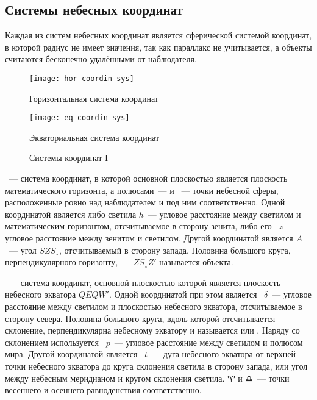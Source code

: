 \subsection{Системы небесных координат}
Каждая из систем небесных координат является сферической системой координат, в которой радиус не имеет значения, так как параллакс не учитывается, а объекты считаются бесконечно удалёнными от наблюдателя.

\begin{figure}[!h]
	\centering
	\begin{subcaptionblock}{0.49\textwidth}
		\texttt{[image: hor-coordin-sys]}
		\caption{Горизонтальная система координат}
	\end{subcaptionblock}
	\hfill
	\begin{subcaptionblock}{0.49\textwidth}
		\texttt{[image: eq-coordin-sys]}
		\caption{Экваториальная система координат}
	\end{subcaptionblock}
	\caption{Системы координат I}
\end{figure}
~--- система координат, в которой основной плоскостью является плоскость математического горизонта, а полюсами~---  и ~--- точки небесной сферы, расположенные ровно над наблюдателем и под ним соответственно. Одной координатой является либо  светила $h$~--- угловое расстояние между светилом и математическим горизонтом, отсчитываемое в сторону зенита, либо его ~$z$~--- угловое расстояние между зенитом и светилом. Другой координатой является  $A$~--- угол $SZS_\star$, отсчитываемый в сторону запада. Половина большого круга, перпендикулярного горизонту,~--- $Z S_\star Z'$  называется  объекта.

~--- система координат,
основной плоскостью которой является плоскость небесного экватора $QEQW'$.
Одной координатой при этом является ~$\delta$~--- угловое
расстояние между светилом и плоскостью небесного экватора, отсчитываемое в
сторону севера. Половина большого круга, вдоль которой отсчитывается склонение,
перпендикулярна небесному экватору и называется  или
. Наряду со склонением
используется ~$p$~--- угловое расстояние между
светилом и полюсом мира. Другой координатой является ~$t$~---
дуга небесного экватора от верхней точки небесного экватора до круга склонения
светила в сторону запада, или угол между небесным меридианом и кругом склонения
светила. $\aries$ и $\libra$~--- точки весеннего и осеннего равноденствия соответственно.

